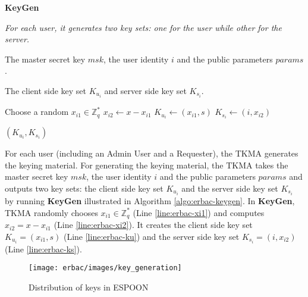 \documentclass[epsfig,a4paper,11pt,titlepage]{book}
\numberwithin{algorithm}{chapter}
\newcommand{\algofontsize}{\fontsize{11}{12}\selectfont}
\begin{document}
\begin{algorithm} [htp]
{\algofontsize
\caption{\textbf{KeyGen}}

\label{algo:erbac-keygen}

\begin{algorithmic}[1]

\INPUT \emph{For each user, it generates two key sets: one for the user while other for the server.}

\Require The master secret key $msk$, the user identity $i$ and the public parameters $params$.

\Ensure The client side key set $K_{u_i}$ and server side key set $K_{s_i}$.

\medskip

\State Choose a random $x_{i1} \in \mathbb{Z}^*_q$ \label{line:erbac-xi1}
\State $x_{i2} \leftarrow x - x_{i1}$ \label{line:erbac-xi2}
\State $K_{u_i} \leftarrow (x_{i1}, s)$ \label{line:erbac-ku}
\State $K_{s_i} \leftarrow (i, x_{i2})$ \label{line:erbac-ks}

\Return $(K_{u_i}, K_{s_i})$

\end{algorithmic}
}
\end{algorithm}

For each user (including an Admin User and a Requester), the \gls{TKMA} generates the keying material. For generating the keying material, the \gls{TKMA} takes the master secret key $msk$, the user identity $i$ and the public parameters $params$ and outputs two key sets: the client side key set $K_{u_i}$ and the server side key set $K_{s_i}$ by running \textbf{KeyGen} illustrated in Algorithm \ref{algo:erbac-keygen}. In \textbf{KeyGen}, \gls{TKMA} randomly chooses $x_{i1} \in \mathbb{Z}^*_q$ (Line \ref{line:erbac-xi1}) and computes $x_{i2} = x - x_{i1}$ (Line \ref{line:erbac-xi2}). It creates the client side key set $K_{u_i} = (x_{i1}, s)$ (Line \ref{line:erbac-ku}) and the server side key set $K_{s_i} = (i, x_{i2})$ (Line \ref{line:erbac-ks}).



\begin{figure} [htp]
\centering
\texttt{[image: erbac/images/key\_generation]} \caption[Distribution of keys in ESPOON]{Distribution of keys in \gls{ESPOON}}
\label{fig:erbac-key_generation}
\end{figure}
\end{document}
